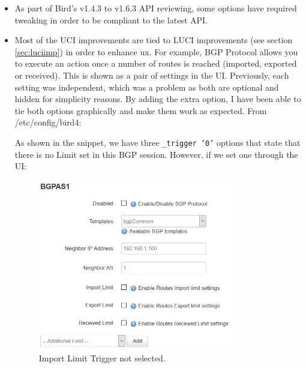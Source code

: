 \begin{itemize}
    \item As part of Bird's v1.4.3 to v1.6.3 API reviewing, some options have required tweaking in order to be compliant to the latest API.
    \item Most of the UCI improvements are tied to LUCI improvements (see section \ref{sec:luciimp}) in order to enhance \acrshort{ux}.
    For example, BGP Protocol allows you to execute an action once a number of routes is reached (imported, exported or received). This is shown as a pair of settings in the UI. Previously, each setting was independent, which was a problem as both are optional and hidden for simplicity reasons.
    By adding the extra option, I have been able to tie both options graphically and make them work as expected.
    From /etc/config/bird4:
    
    As shown in the snippet, we have three \texttt{\_trigger '0'} options that state that there is no Limit set in this BGP session. However, if we set one through the UI:
    
\begin{figure}[H]
    \centering
    \includegraphics[width=0.8\textwidth]{images/bgp/bgptrigger1}
    \caption{Import Limit Trigger not selected.}
    \label{fig:uitiedn}
\end{figure}


\end{itemize}
